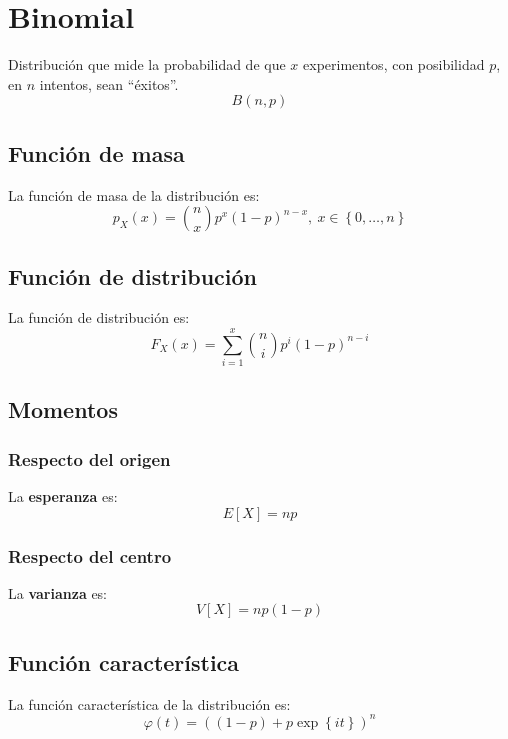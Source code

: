 \section{Binomial}
\label{sec:binomial}
Distribución que mide la probabilidad de que $x$ experimentos, con posibilidad
$p$, en $n$ intentos, sean ``éxitos''. 
\[
\boxed{B\left( n, p \right)}
\]

\subsection{Función de masa}
La función de masa de la distribución es:
\[
p_X \left( x \right) = \binom{n}{x} p^x \left( 1-p \right)^{n-x},\ x \in \left\{ 0, \ldots, n \right\}
\]

\subsection{Función de distribución}
La función de distribución es:
\[
F_X\left( x \right) = \sum_{i=1}^{x} \binom{n}{i} p^i \left( 1-p \right)^{n-i}
\]

\subsection{Momentos}

\subsubsection*{Respecto del origen}
La \textbf{esperanza} es: 
\[
    E\left[ X \right] = np
\]
\subsubsection*{Respecto del centro}
La \textbf{varianza} es:
\[
    V\left[ X \right] = np\left( 1-p \right)
\]

\subsection{Función característica}
La función característica de la distribución es:
\[
\varphi\left( t \right) = \left( \left( 1-p \right) + p \exp\left\{ it \right\} \right)^n
\]

